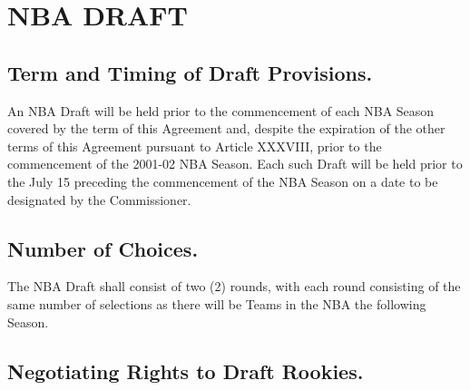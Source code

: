 \documentclass[
]{book}
\begin{document}
\hypertarget{nba-draft}{%
\chapter{NBA DRAFT}\label{nba-draft}}

\hypertarget{term-and-timing-of-draft-provisions.}{%
\section{Term and Timing of Draft Provisions.}\label{term-and-timing-of-draft-provisions.}}

An NBA Draft will be held prior to the commencement of each NBA Season covered by the term of this Agreement and, despite the expiration of the other terms of this Agreement pursuant to Article XXXVIII, prior to the commencement of the 2001-02 NBA Season. Each such Draft will be held prior to the July 15 preceding the commencement of the NBA Season on a date to be designated by the Commissioner.

\hypertarget{number-of-choices.}{%
\section{Number of Choices.}\label{number-of-choices.}}

The NBA Draft shall consist of two (2) rounds, with each round consisting of the same number of selections as there will be Teams in the NBA the following Season.

\hypertarget{negotiating-rights-to-draft-rookies.}{%
\section{Negotiating Rights to Draft Rookies.}\label{negotiating-rights-to-draft-rookies.}}
\end{document}
